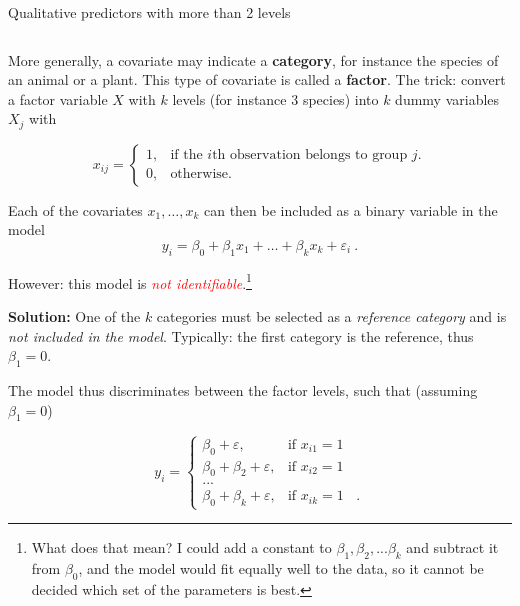 \documentclass[10pt,ignorenonframetext,]{beamer}
\begin{document}
\begin{frame}

\begin{block}{Qualitative predictors with more than 2 levels}

\(~\)

More generally, a covariate may indicate a \textbf{category}, for
instance the species of an animal or a plant. This type of covariate is
called a \textbf{factor}. The trick: convert a factor variable \(X\)
with \(k\) levels (for instance 3 species) into \(k\) dummy variables
\(X_j\) with \vspace{2mm}

\begin{equation*}
x_{ij} = \left\{ 
\begin{array} {ll}
1, & \text{if the $i$th observation belongs to group $j$}.\\
0, & \text{otherwise.}
\end{array}\right.
\end{equation*}

\vspace{4mm}

Each of the covariates \(x_1,\ldots, x_k\) can then be included as a
binary variable in the model \begin{equation*}
y_i = \beta_0 + \beta_1 x_1 + \ldots + \beta_k x_k + \varepsilon_i \ .
\end{equation*}

\vspace{6mm}

However: this model is
\emph{\textcolor{red}{not identifiable}}.\footnote{What does that mean? I could add a constant to $\beta_1, \beta_2, ...\beta_k$ and subtract it from $\beta_0$, and the model would fit equally well to the data, so it cannot be decided which set of the parameters is best.}

\end{block}

\end{frame}

\begin{frame}

\textbf{Solution:} One of the \(k\) categories must be selected as a
\emph{reference category} and is \emph{not included in the model}.
Typically: the first category is the reference, thus \(\beta_1=0\).

\vspace{2mm}

The model thus discriminates between the factor levels, such that
(assuming \(\beta_1=0\))

\begin{equation*}
y_i = \left\{
\begin{array}{ll}
\beta_0 + \varepsilon, & \text{if $x_{i1}=1$ }\\
\beta_0 + \beta_2 + \varepsilon, & \text{if $x_{i2}=1$ }\\
...\\
\beta_0 + \beta_k + \varepsilon, & \text{if $x_{ik}=1$ } \ .
\end{array}\right.
\end{equation*}

\end{frame}
\end{document}
